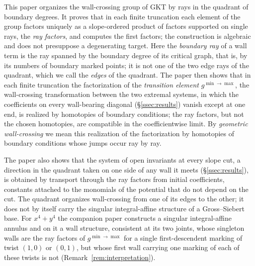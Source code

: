 \documentclass[11pt]{amsart}
\theoremstyle{definition}
\theoremstyle{remark}
\begin{document}
This paper organizes the wall-crossing group of GKT by rays in the
quadrant of boundary degrees.  It proves that in each finite truncation each element of the
group factors uniquely as a slope-ordered product of factors supported on
single rays, the \emph{ray factors}, and computes the first factors; the
construction is algebraic and does not presuppose a degenerating target.  Here
the \emph{boundary ray} of a wall term is the ray spanned by the boundary
degree of its critical graph, that is, by its numbers of boundary marked
points; it is not one of the two edge rays of the quadrant, which we call
the \emph{edges} of the quadrant.  The paper then shows that in each finite
truncation the factorization of the \emph{transition element}
$g^{\min\to\max}$, the wall-crossing transformation between the two extremal
systems, in which the coefficients on every wall-bearing diagonal
(\S\ref{ssec:results}) vanish except at one end, is realized by homotopies of
boundary conditions; the ray factors, but not the chosen homotopies, are
compatible in the coefficientwise limit.  By \emph{geometric wall-crossing} we
mean this realization of the factorization by homotopies of boundary
conditions whose jumps occur ray by ray.

The paper also shows that the system of
open invariants at every slope cut, a direction in the quadrant taken on one
side of any wall it meets (\S\ref{ssec:results}), is obtained by transport
through the ray factors from initial coefficients, constants attached to the
monomials of the potential that do not depend on the cut.  The quadrant organizes
wall-crossing from one of its edges to the other; it does not by itself carry
the singular integral-affine structure of a Gross--Siebert base.  For
$x^4+y^4$ the companion paper \cite{annular} constructs a singular
integral-affine annulus and on it a wall structure, consistent at its two joints, whose singleton walls are the ray factors of $g^{\min\to\max}$ for a single first-descendent marking of twist $(1,0)$ or $(0,1)$, but whose first wall carrying one marking of each of these twists is not (Remark~\ref{rem:interpretation}).
\end{document}
